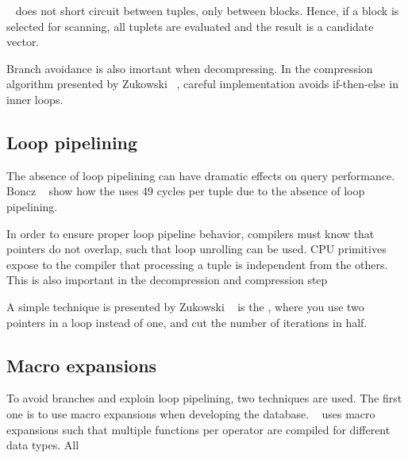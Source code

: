 \blink~\cite{Johnson2008-cp} does not short circuit between tuples, only between blocks. Hence, if a block is selected for scanning, all tuplets are evaluated and the result is a candidate vector.

Branch avoidance is also imortant when decompressing. In the compression algorithm presented by Zukowski \ea~\cite{Zukowski2006-oz}, careful implementation avoids if-then-else in inner loops.

\subsection{Loop pipelining}
\label{sub:Loop pipelining}
The absence of loop pipelining can have dramatic effects on query performance. Boncz \ea~\cite{Boncz2005-wj} show how the \mysql uses 49 cycles per tuple due to the absence of loop pipelining.

In order to ensure proper loop pipeline behavior, compilers must know that pointers do not overlap, such that loop unrolling can be used. CPU primitives expose to the compiler that processing a tuple is independent from the others. This is also important in the decompression and compression step \cite{Zukowski2006-oz}

A simple technique is presented by Zukowski \ea~\cite{Zukowski2006-oz} is the , where you use two pointers in a loop instead of one, and cut the number of iterations in half.

\subsection{Macro expansions}
\label{sub:Macro expansions}
To avoid branches and exploin loop pipelining, two techniques are used. The first one is to use macro expansions when developing the database. \monetdb~\cite{Boncz2002-yj} uses macro expansions such that multiple functions per operator are compiled for different data types. All

